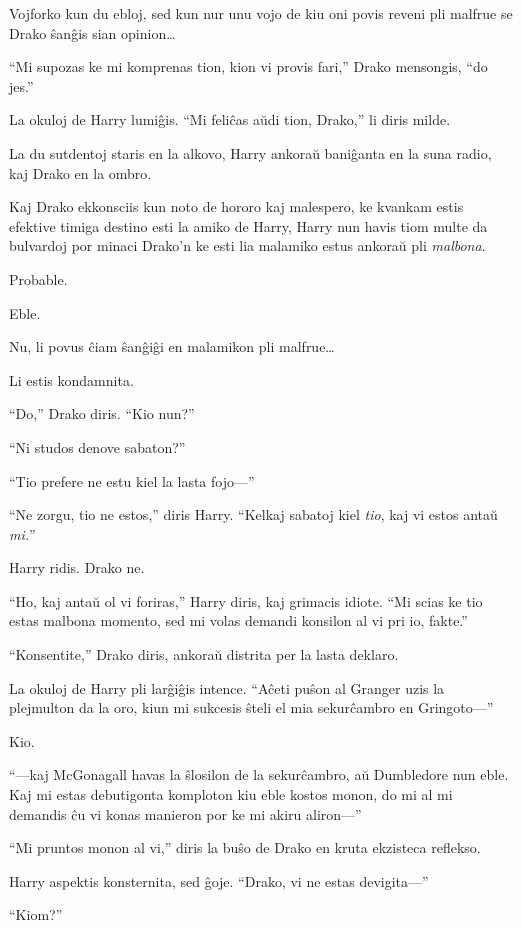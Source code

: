 Vojforko kun du ebloj, sed kun nur unu vojo de kiu oni povis reveni
pli malfrue se Drako ŝanĝis sian opinion\ldots{}

``Mi supozas ke mi komprenas tion, kion vi provis fari,'' Drako mensongis, ``do jes.''

La okuloj de Harry lumiĝis. ``Mi feliĉas aŭdi tion, Drako,'' li diris milde.

La du sutdentoj staris en la alkovo, Harry ankoraŭ baniĝanta en la
suna radio, kaj Drako en la ombro.

Kaj Drako ekkonsciis kun noto de hororo kaj malespero, ke kvankam
estis efektive timiga destino esti la amiko de Harry, Harry nun havis
tiom multe da bulvardoj por minaci Drako'n ke esti lia malamiko estus
ankoraŭ pli \emph{malbona}.

Probable.

Eble.

Nu, li povus ĉiam ŝanĝiĝi en malamikon pli malfrue\ldots{}

Li estis kondamnita.

``Do,'' Drako diris. ``Kio nun?''

``Ni studos denove sabaton?''

``Tio prefere ne estu kiel la lasta fojo—''  

``Ne zorgu, tio ne estos,'' diris Harry. ``Kelkaj sabatoj kiel \emph{tio}, kaj vi estos antaŭ \emph{mi.}''

Harry ridis. Drako ne.

``Ho, kaj antaŭ ol vi foriras,'' Harry diris, kaj grimacis
idiote. ``Mi scias ke tio estas malbona momento, sed mi volas demandi
konsilon al vi pri io, fakte.''

``Konsentite,'' Drako diris, ankoraŭ distrita per la lasta deklaro.

La okuloj de Harry pli larĝiĝis intence. ``Aĉeti puŝon al Granger uzis
la plejmulton da la oro, kiun mi sukcesis ŝteli el mia sekurĉambro en
Gringoto—''

Kio.

``—kaj McGonagall havas la ŝlosilon de la sekurĉambro, aŭ Dumbledore
nun eble. Kaj mi estas debutigonta komploton kiu eble kostos monon, do
mi al mi demandis ĉu vi konas manieron por ke mi akiru aliron—''

``Mi pruntos monon al vi,'' diris la buŝo de Drako en kruta ekzisteca reflekso.

Harry aspektis konsternita, sed ĝoje. ``Drako, vi ne estas devigita—'' 

``Kiom?''

